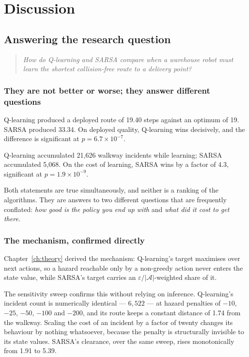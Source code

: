 \chapter{Discussion}
\label{ch:discussion}

\section{Answering the research question}

\begin{quote}
\emph{How do Q-learning and SARSA compare when a warehouse robot must learn the shortest
collision-free route to a delivery point?}
\end{quote}

\subsection{They are not better or worse; they answer different questions}

Q-learning produced a deployed route of 19.40 steps against an optimum of 19. SARSA produced
33.34. On deployed quality, Q-learning wins decisively, and the difference is significant at
$p = 6.7\times10^{-7}$.

Q-learning accumulated 21{,}626 walkway incidents while learning; SARSA accumulated 5{,}068. On
the cost of learning, SARSA wins by a factor of 4.3, significant at $p = 1.9\times10^{-9}$.

Both statements are true simultaneously, and neither is a ranking of the algorithms. They are
answers to two different questions that are frequently conflated: \emph{how good is the policy you
end up with} and \emph{what did it cost to get there}.

\subsection{The mechanism, confirmed directly}

Chapter~\ref{ch:theory} derived the mechanism: Q-learning's target maximises over next actions, so
a hazard reachable only by a non-greedy action never enters the state value, while SARSA's target
carries an $\varepsilon/|\mathcal{A}|$-weighted share of it.

The sensitivity sweep confirms this without relying on inference. Q-learning's incident count is
numerically identical --- $6{,}522$ --- at hazard penalties of $-10$, $-25$, $-50$, $-100$ and
$-200$, and its route keeps a constant distance of 1.74 from the walkway. Scaling the cost of an
incident by a factor of twenty changes its behaviour by nothing whatsoever, because the penalty is
structurally invisible to its state values. SARSA's clearance, over the same sweep, rises
monotonically from 1.91 to 5.39.

